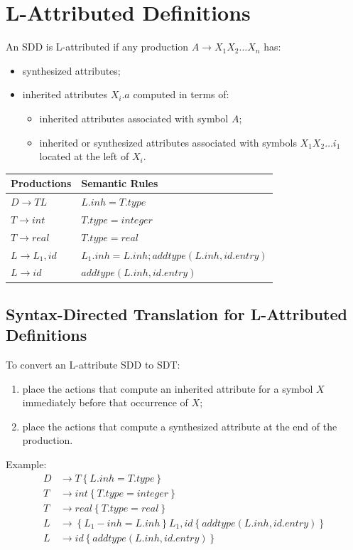 \section{L-Attributed Definitions}
An SDD is L-attributed if any production $A \to X_1 X_2 \ldots X_n$ has:
\begin{itemize}
	\item synthesized attributes;
	\item inherited attributes $X_i.a$ computed in terms of:
	\begin{itemize}
		\item inherited attributes associated with symbol $A$;
		\item inherited or synthesized attributes associated with symbols $X_1 X_2 \ldots i_1$ located at the left of $X_i$.
	\end{itemize}
\end{itemize}

\begin{table}[h]
	\centering
	\begin{tabular}{l|l}
		Productions & Semantic Rules \\ \hline
		$D \to TL$ & $L.inh = T.type$ \\ \hline
		$T \to int$ & $T.type = integer$ \\ \hline
		$T \to real$ & $T.type = real$ \\ \hline
		$L \to L_1, id$ & $L_1.inh = L.inh; addtype(L.inh, id.entry)$ \\ \hline
		$L \to id$ & $addtype(L.inh, id.entry)$
	\end{tabular}
\end{table}

\subsection{Syntax-Directed Translation for L-Attributed Definitions}
To convert an L-attribute SDD to SDT:
\begin{enumerate}
	\item place the actions that compute an inherited attribute for a symbol $X$ immediately before that occurrence of $X$;
	\item place the actions that compute a synthesized attribute at the end of the production.
\end{enumerate}
Example:
\begin{align*}
	D &\to T \left\{L.inh = T.type\right\} \\
	T &\to int \left\{T.type = integer\right\} \\
	T &\to real \left\{T.type = real\right\} \\
	L &\to \left\{L_1-inh = L.inh\right\}L_1, id\left\{addtype(L.inh, id.entry)\right\} \\
	L &\to id \left\{addtype(L.inh, id.entry)\right\}
\end{align*}


